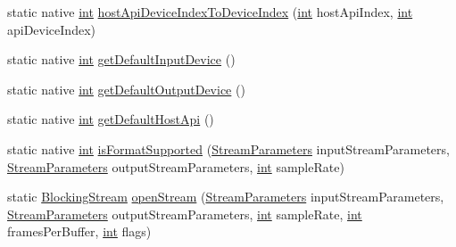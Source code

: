 \begin{DoxyCompactItemize}
\item 
static native \hyperlink{xmltok_8h_a5a0d4a5641ce434f1d23533f2b2e6653}{int} \hyperlink{classcom_1_1portaudio_1_1_port_audio_a6403a73147c43aca3fa733e4ba71c67c}{host\+Api\+Device\+Index\+To\+Device\+Index} (\hyperlink{xmltok_8h_a5a0d4a5641ce434f1d23533f2b2e6653}{int} host\+Api\+Index, \hyperlink{xmltok_8h_a5a0d4a5641ce434f1d23533f2b2e6653}{int} api\+Device\+Index)
\item 
static native \hyperlink{xmltok_8h_a5a0d4a5641ce434f1d23533f2b2e6653}{int} \hyperlink{classcom_1_1portaudio_1_1_port_audio_a10036af29e71cc9f07e63bfd6030045b}{get\+Default\+Input\+Device} ()
\item 
static native \hyperlink{xmltok_8h_a5a0d4a5641ce434f1d23533f2b2e6653}{int} \hyperlink{classcom_1_1portaudio_1_1_port_audio_ad0f16ff3269d3b8166a7581de751c427}{get\+Default\+Output\+Device} ()
\item 
static native \hyperlink{xmltok_8h_a5a0d4a5641ce434f1d23533f2b2e6653}{int} \hyperlink{classcom_1_1portaudio_1_1_port_audio_ae44bdce73311d1ecbaf9667ab58628de}{get\+Default\+Host\+Api} ()
\item 
static native \hyperlink{xmltok_8h_a5a0d4a5641ce434f1d23533f2b2e6653}{int} \hyperlink{classcom_1_1portaudio_1_1_port_audio_ac1f0b8268c0819eced0aea804b28638a}{is\+Format\+Supported} (\hyperlink{classcom_1_1portaudio_1_1_stream_parameters}{Stream\+Parameters} input\+Stream\+Parameters, \hyperlink{classcom_1_1portaudio_1_1_stream_parameters}{Stream\+Parameters} output\+Stream\+Parameters, \hyperlink{xmltok_8h_a5a0d4a5641ce434f1d23533f2b2e6653}{int} sample\+Rate)
\item 
static \hyperlink{classcom_1_1portaudio_1_1_blocking_stream}{Blocking\+Stream} \hyperlink{classcom_1_1portaudio_1_1_port_audio_a32cbdd9a1e8f4cb1c0ad475a6cbc579b}{open\+Stream} (\hyperlink{classcom_1_1portaudio_1_1_stream_parameters}{Stream\+Parameters} input\+Stream\+Parameters, \hyperlink{classcom_1_1portaudio_1_1_stream_parameters}{Stream\+Parameters} output\+Stream\+Parameters, \hyperlink{xmltok_8h_a5a0d4a5641ce434f1d23533f2b2e6653}{int} sample\+Rate, \hyperlink{xmltok_8h_a5a0d4a5641ce434f1d23533f2b2e6653}{int} frames\+Per\+Buffer, \hyperlink{xmltok_8h_a5a0d4a5641ce434f1d23533f2b2e6653}{int} flags)
\end{DoxyCompactItemize}
